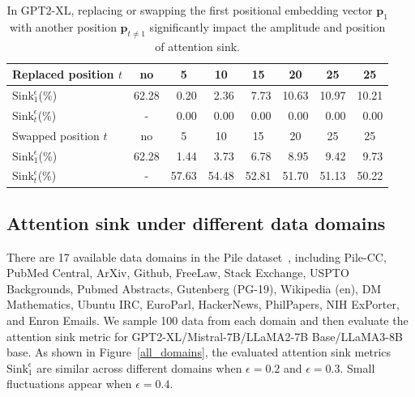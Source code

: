 \begin{table}[htbp]
\caption{{In GPT2-XL, replacing or swapping the first positional embedding vector $\boldsymbol{p}_1$ with another position $\boldsymbol{p}_{t\neq 1}$ significantly impact the amplitude and position of attention sink.}}
\vspace{-.2cm}
\begin{center}
\begin{tabular}{l|ccccccc}
\toprule
Replaced position $t$ & no & 5 & 10 & 15 & 20 & 25 & 25 \\
\midrule
$\textrm{Sink}_1^{\epsilon}$(\%) & 62.28 & \,\,\,0.20 & \,\,\,2.36 & \,\,\,7.73 & 10.63 & 10.97 & 10.21 \\
$\textrm{Sink}_t^{\epsilon}$(\%) & - &  \,\,\,0.00 & \,\,\,0.00 & \,\,\,0.00 & \,\,\,0.00 & \,\,\,0.00 & \,\,\,0.00\\
\midrule
Swapped position $t$ & no & 5 & 10 & 15 & 20 & 25 & 25 \\
\midrule
$\textrm{Sink}_1^{\epsilon}$(\%) & 62.28 & \,\,\,1.44 & \,\,\,3.73 & \,\,\,6.78 & \,\,\,8.95 & \,\,\,9.42 & \,\,\,9.73 \\
$\textrm{Sink}_t^{\epsilon}$(\%) &  - & 57.63 & 54.48 & 52.81 & 51.70 & 51.13 & 50.22 \\
\bottomrule
\end{tabular}
\end{center}
\vspace{-.2cm}
\label{learnable_pe}
\end{table}



\subsection{Attention sink under different data domains}\label{vis_domains}

There are 17 available data domains in the Pile dataset~\citep{gao2020pile}, including Pile-CC, PubMed Central, ArXiv, Github, FreeLaw, Stack Exchange, USPTO Backgrounds, Pubmed Abstracts, Gutenberg (PG-19), Wikipedia (en), DM Mathematics, Ubuntu IRC, EuroParl, HackerNews, PhilPapers, NIH ExPorter, and Enron Emails. We sample 100 data from each domain and then evaluate the attention sink metric for GPT2-XL/Mistral-7B/LLaMA2-7B Base/LLaMA3-8B base. As shown in Figure~\ref{all_domains}, the evaluated attention sink metrics $\textrm{Sink}_1^{\epsilon}$ are similar across different domains when $\epsilon=\textrm{0.2}$ and $\epsilon=\textrm{0.3}$. Small fluctuations appear when $\epsilon=\textrm{0.4}$.



